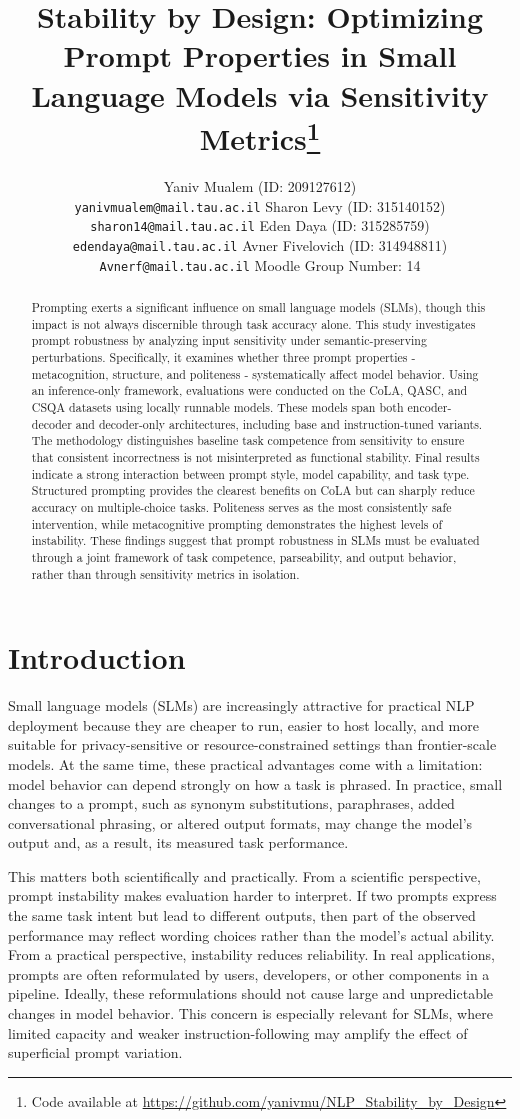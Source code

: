 \documentclass[11pt]{article}
\title{Stability by Design: Optimizing Prompt Properties in Small Language Models via Sensitivity Metrics\thanks{Code available at \url{https://github.com/yanivmu/NLP_Stability_by_Design}}}
\author{
Yaniv Mualem (ID: 209127612) \\
\texttt{yanivmualem@mail.tau.ac.il}
\And
Sharon Levy (ID: 315140152) \\
\texttt{sharon14@mail.tau.ac.il}
\AND
Eden Daya (ID: 315285759) \\
\texttt{edendaya@mail.tau.ac.il}
\And
Avner Fivelovich (ID: 314948811) \\
\texttt{Avnerf@mail.tau.ac.il}
\AND
\textmd{Moodle Group Number: 14}
}
\begin{document}
\maketitle

\begin{abstract}
Prompting exerts a significant influence on small language models (SLMs), though this impact is not always discernible through task accuracy alone. This study investigates prompt robustness by analyzing input sensitivity under semantic-preserving perturbations. Specifically, it examines whether three prompt properties - metacognition, structure, and politeness - systematically affect model behavior. Using an inference-only framework, evaluations were conducted on the CoLA, QASC, and CSQA datasets using locally runnable models. These models span both encoder-decoder and decoder-only architectures, including base and instruction-tuned variants. The methodology distinguishes baseline task competence from sensitivity to ensure that consistent incorrectness is not misinterpreted as functional stability. Final results indicate a strong interaction between prompt style, model capability, and task type. Structured prompting provides the clearest benefits on CoLA but can sharply reduce accuracy on multiple-choice tasks. Politeness serves as the most consistently safe intervention, while metacognitive prompting demonstrates the highest levels of instability. These findings suggest that prompt robustness in SLMs must be evaluated through a joint framework of task competence, parseability, and output behavior, rather than through sensitivity metrics in isolation.
\end{abstract}

\section{Introduction}

Small language models (SLMs) are increasingly attractive for practical NLP deployment because they are cheaper to run, easier to host locally, and more suitable for privacy-sensitive or resource-constrained settings than frontier-scale models. At the same time, these practical advantages come with a limitation: model behavior can depend strongly on how a task is phrased. In practice, small changes to a prompt, such as synonym substitutions, paraphrases, added conversational phrasing, or altered output formats, may change the model's output and, as a result, its measured task performance.

This matters both scientifically and practically. From a scientific perspective, prompt instability makes evaluation harder to interpret. If two prompts express the same task intent but lead to different outputs, then part of the observed performance may reflect wording choices rather than the model's actual ability. From a practical perspective, instability reduces reliability. In real applications, prompts are often reformulated by users, developers, or other components in a pipeline. Ideally, these reformulations should not cause large and unpredictable changes in model behavior. This concern is especially relevant for SLMs, where limited capacity and weaker instruction-following may amplify the effect of superficial prompt variation.
\end{document}
